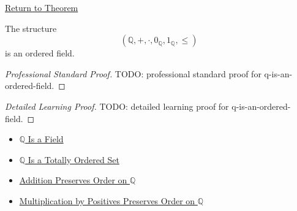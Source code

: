 \newpage
{}
\label{prf:q-is-an-ordered-field}

\begin{remark*}[Return]
\hyperref[thm:q-is-an-ordered-field]{Return to Theorem}
\end{remark*}

\begin{theorem*}
The structure
\[
(\mathbb{Q},+,\cdot,0_{\mathbb{Q}},1_{\mathbb{Q}},\le)
\]
is an ordered field.
\end{theorem*}

\begin{proof}[Professional Standard Proof]
\LRAProofBodyStart
TODO: professional standard proof for q-is-an-ordered-field.
\end{proof}

\begin{proof}[Detailed Learning Proof]
\LRAProofBodyStart
TODO: detailed learning proof for q-is-an-ordered-field.
\end{proof}

\begin{remark*}
\end{remark*}

\begin{dependencies}
\begin{itemize}
  \item \hyperref[thm:q-is-a-field]{$\mathbb{Q}$ Is a Field}
  \item \hyperref[thm:q-totally-ordered-set]{$\mathbb{Q}$ Is a Totally Ordered Set}
  \item \hyperref[thm:addition-preserves-order-on-q]{Addition Preserves Order on $\mathbb{Q}$}
  \item \hyperref[thm:positive-multiplication-preserves-order-on-q]{Multiplication by Positives Preserves Order on $\mathbb{Q}$}
\end{itemize}
\end{dependencies}

\clearpage
